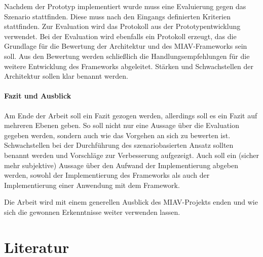 \documentclass[11pt,headsepline,a4paper,bibtotoc,liststotoc,DIV12,BCOR12mm]{scrartcl}
\begin{document}
  Nachdem der Prototyp implementiert wurde muss eine Evaluierung gegen das Szenario stattfinden. Diese muss nach den Eingangs definierten Kriterien stattfinden. Zur Evaluation wird das Protokoll aus der Prototypentwicklung verwendet. Bei der Evaluation wird ebenfalls ein Protokoll erzeugt, das die Grundlage für die Bewertung der Architektur und des MIAV-Frameworks sein soll. Aus den Bewertung werden schließlich die Handlungsempfehlungen für die weitere Entwicklung des Frameworks abgeleitet. Stärken und Schwachstellen der Architektur sollen klar benannt werden.


\paragraph{Fazit und Ausblick} %
\label{par:fazit_und_ausblick}

  Am Ende der Arbeit soll ein Fazit gezogen werden, allerdings soll es ein Fazit auf mehreren Ebenen geben. So soll nicht nur eine Aussage über die Evaluation gegeben werden, sondern auch wie das Vorgehen an sich zu bewerten ist. Schwachstellen bei der Durchführung des szenariobasierten Ansatz sollten benannt werden und Vorschläge zur Verbesserung aufgezeigt. Auch soll ein (sicher mehr subjektive) Aussage über den Aufwand der Implementierung abgeben werden, sowohl der Implementierung des Frameworks als auch der Implementierung einer Anwendung mit dem Framework.
  
  Die Arbeit wird mit einem generellen Ausblick des MIAV-Projekts enden und wie sich die gewonnen Erkenntnisse weiter verwenden lassen.



\section{Literatur} %
\label{sec:literatur}


% 
% 
% 

\end{document}
